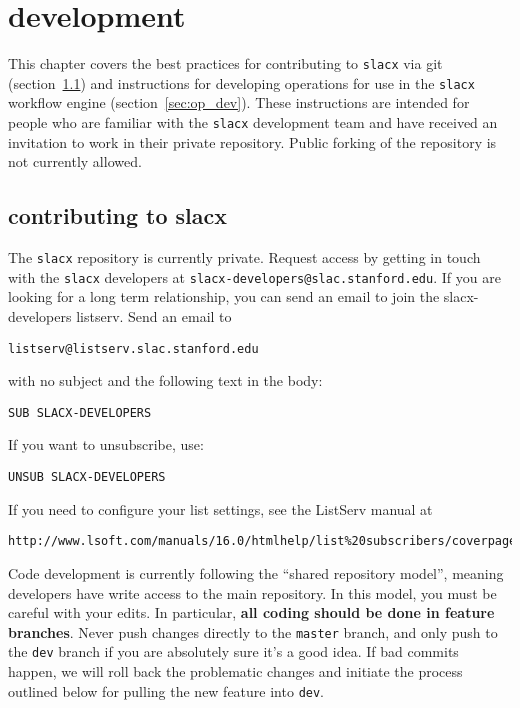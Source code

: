 \chapter{development}
\label{ch:dev}

This chapter covers the best practices 
for contributing to \verb|slacx| via git (section~\ref{sec:slacx_dev})
and instructions for developing operations
for use in the \verb|slacx| workflow engine (section~\ref{sec:op_dev}).
These instructions are intended for people
who are familiar with the \verb|slacx| development team
and have received an invitation to work in their private repository.
Public forking of the repository is not currently allowed.

\section{contributing to slacx}
\label{sec:slacx_dev}

The \verb|slacx| repository is currently private.
Request access by getting in touch with the \verb|slacx| developers
at \verb|slacx-developers@slac.stanford.edu|. 
If you are looking for a long term relationship,
you can send an email to join the slacx-developers listserv.
Send an email to 
\begin{lstlisting}
listserv@listserv.slac.stanford.edu
\end{lstlisting}
with no subject and the following text in the body: 
\begin{lstlisting}
SUB SLACX-DEVELOPERS
\end{lstlisting}
If you want to unsubscribe, use:
\begin{lstlisting}
UNSUB SLACX-DEVELOPERS
\end{lstlisting}
If you need to configure your list settings, see the ListServ manual at
\begin{lstlisting}
http://www.lsoft.com/manuals/16.0/htmlhelp/list%20subscribers/coverpage.html
\end{lstlisting}

Code development is currently following the ``shared repository model'',
meaning developers have write access to the main repository.
In this model, you must be careful with your edits.
In particular, \textbf{all coding should be done in feature branches}.
Never push changes directly to the \verb|master| branch,
and only push to the \verb|dev| branch if you are absolutely sure it's a good idea.
If bad commits happen, we will roll back the problematic changes 
and initiate the process outlined below for pulling the new feature into \verb|dev|.


